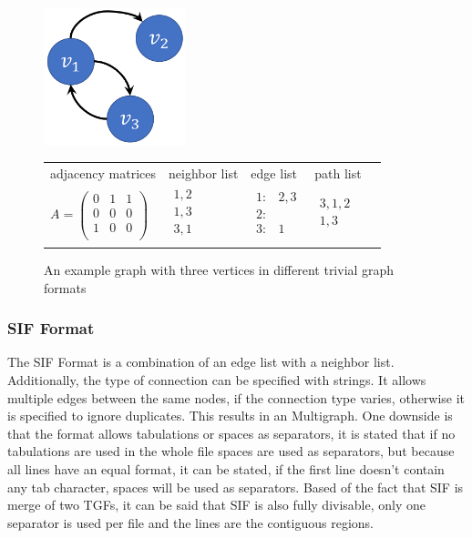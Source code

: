 \begin{figure}[H]
	\centering
	\includegraphics[height=4cm]{img/simple.png}
	\label{simple}
		\setlength{\tabcolsep}{01cm} %
		\begin{tabular}{lllll}
			\\
			adjacency matrices & neighbor list & edge list & path list \\
			$A = \left( \begin{array}{rrr}0 & 1 & 1 \\0 & 0 & 0 \\1 & 0 & 0\\\end{array}\right)$ &$\begin{array}{lll}1, 2\\1, 3\\3, 1\\\end{array}$ &$\begin{array}{lll}1: & 2,3 \\ 2: \\ 3: & 1\\\end{array}$ &$\begin{array}{lll}3,1,2 \\ 1,3 \\\end{array}$ \\
			
		\end{tabular}
	\caption{An example graph with three vertices in different trivial graph formats\cite{Roughan.10.03.2015}}
\end{figure}

		

\subsubsection{SIF Format}
The SIF Format is a combination of an edge list with a neighbor list. Additionally, the type of connection can be specified with strings. It allows multiple edges between the same nodes, if the connection type varies, otherwise it is specified to ignore duplicates. This results in an Multigraph. One downside is that the format allows tabulations or spaces as separators, it is stated that if no tabulations are used in the whole file spaces are used as separators, but because all lines have an equal format, it can be stated, if the first line doesn’t contain any tab character, spaces will be used as separators. Based of the fact that SIF is merge of two TGFs, it can be said that SIF is also fully divisable, only one separator is used per file and the lines are the contiguous regions. \cite{TheCytoscapeConsortium.2017}

